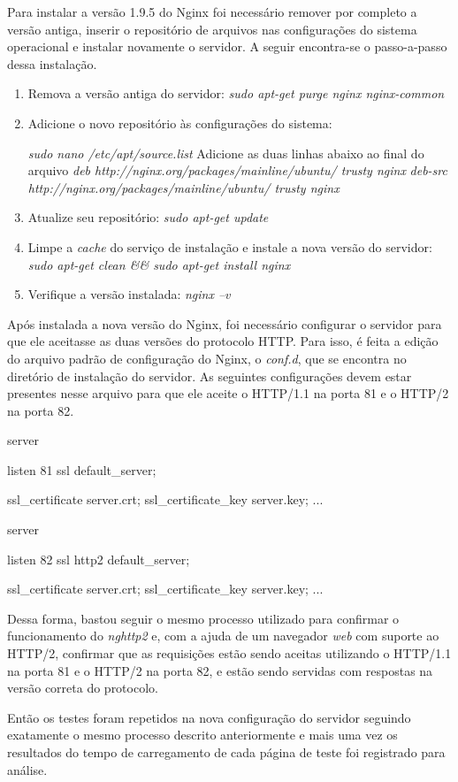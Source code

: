 Para instalar a versão 1.9.5 do Nginx foi necessário remover por completo a versão antiga, inserir o repositório de arquivos nas configurações do sistema operacional e instalar novamente o servidor. A seguir encontra-se o passo-a-passo dessa instalação.

\begin{enumerate}
	\item Remova a versão antiga do servidor: \textit{sudo apt-get purge nginx nginx-common}
	\item Adicione o novo repositório às configurações do sistema:
		\begin{center}
			\textit{sudo nano /etc/apt/source.list}
			Adicione as duas linhas abaixo ao final do arquivo
			\textit{deb http://nginx.org/packages/mainline/ubuntu/ trusty nginx}
			\textit{deb-src http://nginx.org/packages/mainline/ubuntu/ trusty nginx}
		\end{center}
	\item Atualize seu repositório: \textit{sudo apt-get update}
	\item Limpe a \textit{cache} do serviço de instalação e instale a nova versão do servidor: \textit{sudo apt-get clean \&\& sudo apt-get install nginx}
	\item Verifique a versão instalada: \textit{nginx --v}
\end{enumerate}

Após instalada a nova versão do Nginx, foi necessário configurar o servidor para que ele aceitasse as duas versões do protocolo HTTP. Para isso, é feita a edição do arquivo padrão de configuração do Nginx, o \textit{conf.d}, que se encontra no diretório de instalação do servidor. As seguintes configurações devem estar presentes nesse arquivo para que ele aceite o HTTP/1.1 na porta 81 e o HTTP/2 na porta 82.

\begin{center}
server {
    listen 81 ssl default\_server;

    ssl\_certificate    server.crt;
    ssl\_certificate\_key server.key;
    ...
}

server {
    listen 82 ssl http2 default\_server;

    ssl\_certificate    server.crt;
    ssl\_certificate\_key server.key;
    ...
}
\end{center}

Dessa forma, bastou seguir o mesmo processo utilizado para confirmar o funcionamento do \textit{nghttp2} e, com a ajuda de um navegador \textit{web} com suporte ao HTTP/2, confirmar que as requisições estão sendo aceitas utilizando o HTTP/1.1 na porta 81 e o HTTP/2 na porta 82, e estão sendo servidas com respostas na versão correta do protocolo.

Então os testes foram repetidos na nova configuração do servidor seguindo exatamente o mesmo processo descrito anteriormente e mais uma vez os resultados do tempo de carregamento de cada página de teste foi registrado para análise.